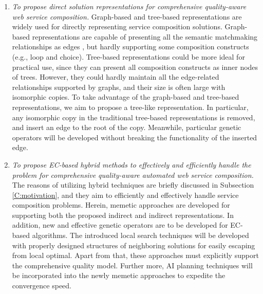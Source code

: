 \begin{enumerate}
\begin{enumerate}
    
    \item \emph{To propose direct solution representations for comprehensive quality-aware web service composition.} Graph-based and tree-based representations are widely used for directly representing service composition solutions. Graph-based representations are capable of presenting all the semantic matchmaking relationships as edges \cite{lecue2009optimizing,wang2017comprehensive}, but hardly supporting some composition constructs (e.g., loop and choice). Tree-based representations could be more ideal for practical use, since they can present all composition constructs as inner nodes of trees. However, they could hardly maintain all the edge-related relationships supported by graphs, and their size is often large with isomorphic copies. To take advantage of the graph-based and tree-based representations, we aim to propose a tree-like representation. In particular, any isomorphic copy in the traditional tree-based representations is removed, and insert an edge to the root of the copy. Meanwhile, particular genetic operators will be developed without breaking the functionality of the inserted edge.
        
    \item \emph{To propose EC-based hybrid methods to effectively and efficiently handle the problem for comprehensive quality-aware automated web service composition.} The reasons of utilizing hybrid techniques are briefly discussed in Subsection \ref{C:motivation}, and they aim to efficiently and effectively handle service composition problems. Herein, memetic approaches are developed for supporting both the proposed indirect and indirect representations. In addition, new and effective genetic operators are to be developed for EC-based algorithms. The introduced local search techniques will be developed with properly designed structures of neighboring solutions for easily escaping from local optimal. Apart from that, these approaches must explicitly support the comprehensive quality model. Further more, AI planning techniques will be incorporated into the newly memetic approaches to expedite the convergence speed.
  \end{enumerate}
 

\end{enumerate}
